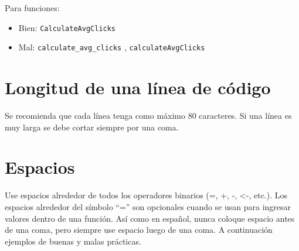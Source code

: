 \documentclass[10pt,]{krantz}
\begin{document}
Para funciones:

\begin{itemize}
    \item Bien: \verb|CalculateAvgClicks| 
    \item Mal: \verb|calculate_avg_clicks| , \verb|calculateAvgClicks|
\end{itemize}

\section{Longitud de una línea de
código}\label{longitud-de-una-linea-de-codigo}

Se recomienda que cada línea tenga como máximo 80 caracteres. Si una
línea es muy larga se debe cortar siempre por una coma.

\section{Espacios}\label{espacios}

Use espacios alrededor de todos los operadores binarios (=, +, -,
\textless{}-, etc.). Los espacios alrededor del símbolo ``='' son
opcionales cuando se usan para ingresar valores dentro de una función.
Así como en español, nunca coloque espacio antes de una coma, pero
siempre use espacio luego de una coma. A continuación ejemplos de buenas
y malas prácticas.
\end{document}
